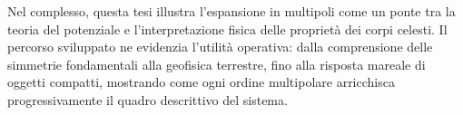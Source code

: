 \documentclass[10pt]{article}
\begin{document}
Nel complesso, questa tesi illustra l'espansione in multipoli come un ponte tra la teoria del potenziale e l'interpretazione fisica delle proprietà dei corpi celesti. Il percorso sviluppato ne evidenzia l'utilità operativa: dalla comprensione delle simmetrie fondamentali alla geofisica terrestre, fino alla risposta mareale di oggetti compatti, mostrando come ogni ordine multipolare arricchisca progressivamente il quadro descrittivo del sistema.

\end{document}
